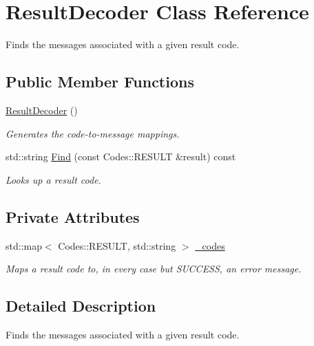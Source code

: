 \hypertarget{classResultDecoder}{
\section{ResultDecoder Class Reference}
\label{classResultDecoder}
}


Finds the messages associated with a given result code.  


\subsection*{Public Member Functions}
\begin{DoxyCompactItemize}
\item 
\hypertarget{classResultDecoder_afafd3458bdbcbd7b1b95545f47151358}{
\hyperlink{classResultDecoder_afafd3458bdbcbd7b1b95545f47151358}{ResultDecoder} ()}
\label{classResultDecoder_afafd3458bdbcbd7b1b95545f47151358}

\begin{DoxyCompactList}\small\item\em Generates the code-\/to-\/message mappings. \item\end{DoxyCompactList}\item 
std::string \hyperlink{classResultDecoder_a3da4876ac5cd585a7d6176b568248b1d}{Find} (const Codes::RESULT \&result) const 
\begin{DoxyCompactList}\small\item\em Looks up a result code. \item\end{DoxyCompactList}\end{DoxyCompactItemize}
\subsection*{Private Attributes}
\begin{DoxyCompactItemize}
\item 
std::map$<$ Codes::RESULT, std::string $>$ \hyperlink{classResultDecoder_ab19497e41c5d1a0546ed33642cad48dd}{\_\-codes}
\begin{DoxyCompactList}\small\item\em Maps a result code to, in every case but SUCCESS, an error message. \item\end{DoxyCompactList}\end{DoxyCompactItemize}


\subsection{Detailed Description}
Finds the messages associated with a given result code. 

